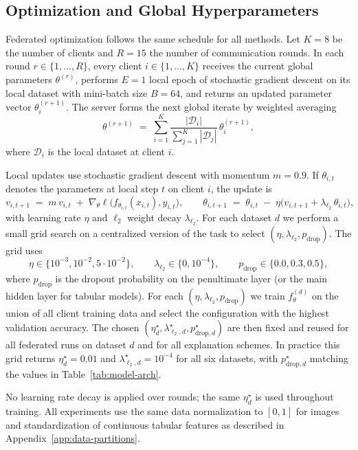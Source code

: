 \documentclass{article}
\theoremstyle{plain}
\theoremstyle{definition}
\theoremstyle{remark}
\begin{document}
\subsection{Optimization and Global Hyperparameters}

Federated optimization follows the same schedule for all methods. Let $K{=}8$ be the number of clients and $R{=}15$ the number of communication rounds. In each round $r\in\{1,\dots,R\}$, every client $i\in\{1,\dots,K\}$ receives the current global parameters $\theta^{(r)}$, performs $E{=}1$ local epoch of stochastic gradient descent on its local dataset with mini-batch size $B{=}64$, and returns an updated parameter vector $\theta_i^{(r+1)}$. The server forms the next global iterate by weighted averaging
\[
\theta^{(r+1)} \;=\; \sum_{i=1}^{K} \frac{|\mathcal{D}_i|}{\sum_{j=1}^{K} |\mathcal{D}_j|} \,\theta_i^{(r+1)} ,
\]
where $\mathcal{D}_i$ is the local dataset at client $i$.

Local updates use stochastic gradient descent with momentum $m{=}0.9$. If $\theta_{i,t}$ denotes the parameters at local step $t$ on client $i$, the update is
\[
v_{i,t+1} \;=\; m\,v_{i,t} \;+\; \nabla_{\theta} \ell\big(f_{\theta_{i,t}}(x_{i,t}), y_{i,t}\big),\qquad
\theta_{i,t+1} \;=\; \theta_{i,t} \;-\; \eta \big( v_{i,t+1} + \lambda_{\ell_2}\,\theta_{i,t} \big),
\]
with learning rate $\eta$ and $\ell_2$ weight decay $\lambda_{\ell_2}$. For each dataset $d$ we perform a small grid search on a centralized version of the task to select $(\eta,\lambda_{\ell_2},p_{\text{drop}})$. The grid uses
\[
\eta \in \{10^{-3}, 10^{-2}, 5\cdot10^{-2}\}, \qquad
\lambda_{\ell_2} \in \{0,10^{-4}\}, \qquad
p_{\text{drop}} \in \{0.0, 0.3, 0.5\},
\]
where $p_{\text{drop}}$ is the dropout probability on the penultimate layer (or the main hidden layer for tabular models). For each $(\eta,\lambda_{\ell_2},p_{\text{drop}})$ we train $f_{\theta}^{(d)}$ on the union of all client training data and select the configuration with the highest validation accuracy. The chosen $(\eta^\star_d,\lambda^\star_{\ell_2,d},p^\star_{\text{drop},d})$ are then fixed and reused for all federated runs on dataset $d$ and for all explanation schemes. In practice this grid returns $\eta^\star_d = 0.01$ and $\lambda^\star_{\ell_2,d} = 10^{-4}$ for all six datasets, with $p^\star_{\text{drop},d}$ matching the values in Table~\ref{tab:model-arch}.

No learning rate decay is applied over rounds; the same $\eta^\star_d$ is used throughout training. All experiments use the same data normalization to $[0,1]$ for images and standardization of continuous tabular features as described in Appendix~\ref{app:data-partitions}. 
\end{document}
